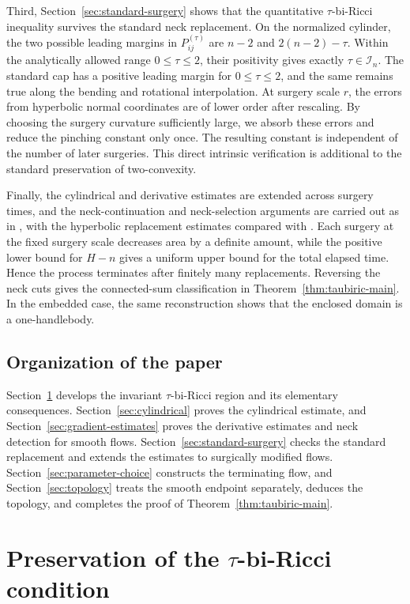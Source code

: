 \documentclass[11pt,reqno]{amsart}
\theoremstyle{definition}
\theoremstyle{remark}
\numberwithin{equation}{section}
\begin{document}
Third, Section~\ref{sec:standard-surgery} shows that the quantitative
$\tau$-bi-Ricci inequality survives the standard neck replacement.  On the
 normalized cylinder, the two possible leading margins in
 $P_{ij}^{(\tau)}$ are $n-2$ and $2(n-2)-\tau$.  Within the analytically
 allowed range $0\leq\tau\leq2$, their positivity gives exactly
 $\tau\in\mathcal I_n$.  The standard cap has a positive leading margin for
 $0\leq\tau\leq2$, and the same remains true along the bending and rotational
 interpolation.  At surgery scale $r$, the errors from hyperbolic
normal coordinates are of lower order after rescaling.  By choosing the
surgery curvature sufficiently large, we absorb these errors and reduce the
pinching constant only once.  The resulting constant is independent of the
number of later surgeries.  This direct intrinsic verification is additional
to the standard preservation of two-convexity.

Finally, the cylindrical and derivative estimates are extended across
surgery times, and the neck-continuation and neck-selection arguments are
carried out as in \cites{HS09,LN21}, with the hyperbolic replacement estimates
compared with \cite{BH17}.  Each surgery at the fixed surgery scale decreases
area by a definite amount, while the positive lower bound for $H-n$ gives a
uniform upper bound for the total elapsed time.  Hence the process terminates
after finitely many replacements.  Reversing the neck cuts gives the
connected-sum classification in Theorem~\ref{thm:taubiric-main}.  In the
embedded case, the same reconstruction shows that the enclosed domain is a
one-handlebody. 

\subsection{Organization of the paper}

Section~\ref{sec:preliminaries} develops the invariant $\tau$-bi-Ricci region
and its elementary consequences.  Section~\ref{sec:cylindrical} proves the
cylindrical estimate, and Section~\ref{sec:gradient-estimates} proves the
derivative estimates and neck detection for smooth flows.
Section~\ref{sec:standard-surgery} checks the standard replacement and
extends the estimates to surgically modified flows.
Section~\ref{sec:parameter-choice} constructs the terminating flow, and
Section~\ref{sec:topology} treats the smooth endpoint separately, deduces the
topology, and completes the proof of Theorem~\ref{thm:taubiric-main}.


\section{Preservation of the \texorpdfstring{$\tau$}{tau}-bi-Ricci condition}
\label{sec:preliminaries}
\end{document}
